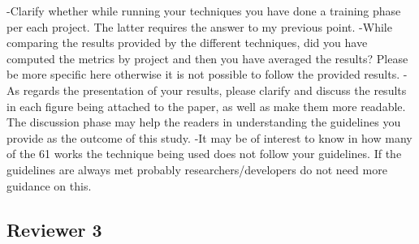 \documentclass[10pt,a4wide]{article}
\renewenvironment{leftbar}{%
	\vspace{0.1cm}
	\def\FrameCommand{\vrule width 0.4pt \hspace{15pt}}%
	\MakeFramed {\advance\hsize-\width \FrameRestore}}%
{\endMakeFramed\vspace{0.1cm}}
\begin{document}
\begin{leftbar}
-Clarify whether while running your techniques you have done a training phase per each project. The latter requires the answer to my previous point.
-While comparing the results provided by the different techniques, did you have computed the metrics by project and then you have averaged the results? Please be more specific here otherwise it is not possible to follow the provided results.
-As regards the presentation of your results, please clarify and discuss the results in each figure being attached to the paper, as well as make them more readable. The discussion phase may help the readers in understanding the guidelines you provide as the outcome of this study.
-It may be of interest to know in how many of the 61 works the technique being used does not follow your guidelines. If the guidelines are always met probably researchers/developers do not need more guidance on this.  
\end{leftbar}


\subsection*{Reviewer 3}
\end{document}

